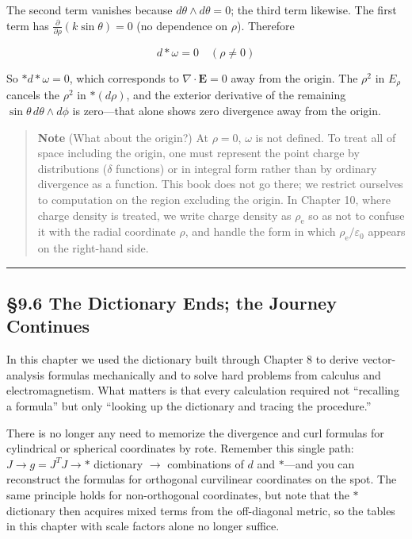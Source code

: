 The second term vanishes because \(d\theta\wedge d\theta = 0\); the
third term likewise. The first term has
\(\frac{\partial}{\partial\rho}(k\sin\theta) = 0\) (no dependence on
\(\rho\)). Therefore

\[d\ast\omega = 0 \quad (\rho \neq 0)\]

So \(\ast d\ast\omega = 0\), which corresponds to
\(\nabla\cdot\mathbf{E}=0\) away from the origin. The \(\rho^2\) in
\(E_\rho\) cancels the \(\rho^2\) in \(\ast(d\rho)\), and the exterior
derivative of the remaining \(\sin\theta\,d\theta\wedge d\phi\) is
zero---that alone shows zero divergence away from the origin.

\begin{quote}
\textbf{Note} (What about the origin?) At \(\rho = 0\), \(\omega\) is
not defined. To treat all of space including the origin, one must
represent the point charge by distributions (\(\delta\) functions) or in
integral form rather than by ordinary divergence as a function. This
book does not go there; we restrict ourselves to computation on the
region excluding the origin. In Chapter 10, where charge density is
treated, we write charge density as \(\rho_{\mathrm e}\) so as not to
confuse it with the radial coordinate \(\rho\), and handle the form in
which \(\rho_{\mathrm e}/\varepsilon_0\) appears on the right-hand side.
\end{quote}

\begin{center}\rule{0.5\linewidth}{0.5pt}\end{center}

\hypertarget{the-dictionary-ends-the-journey-continues}{%
\subsection{§9.6 The Dictionary Ends; the Journey
Continues}\label{the-dictionary-ends-the-journey-continues}}

In this chapter we used the dictionary built through Chapter 8 to derive
vector-analysis formulas mechanically and to solve hard problems from
calculus and electromagnetism. What matters is that every calculation
required not ``recalling a formula'' but only ``looking up the
dictionary and tracing the procedure.''

There is no longer any need to memorize the divergence and curl formulas
for cylindrical or spherical coordinates by rote. Remember this single
path: \(J \to g = J^T J \to \ast\) dictionary \(\to\) combinations of
\(d\) and \(\ast\)---and you can reconstruct the formulas for orthogonal
curvilinear coordinates on the spot. The same principle holds for
non-orthogonal coordinates, but note that the \(\ast\) dictionary then
acquires mixed terms from the off-diagonal metric, so the tables in this
chapter with scale factors alone no longer suffice.

